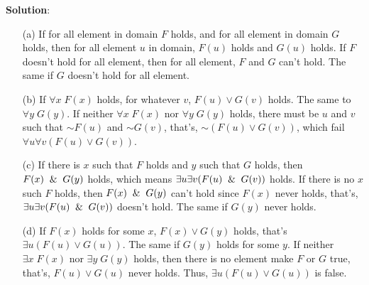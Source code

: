 \documentclass{ctexart}
\newcommand{\unsim}{\mathord{\sim}}
\begin{document}
\textbf{Solution}:
\begin{itemize}

\item[(a)] If for all element in domain $F$ holds, and for all element in domain $G$ holds, then for all element $u$
in domain, $F(u)$ holds and $G(u)$ holds. If $F$ doesn't hold for all element,
then for all element, $F$ and $G$ can't hold. The same if $G$ doesn't hold for all element.

\item[(b)] If $\forall x\; F(x)$ holds, for whatever $v$, $F(u) \lor G(v)$ holds. The same to $\forall y\; G(y)$.
If neither $\forall x\; F(x)$ nor $\forall y\; G(y)$ holds, there must be $u$ and $v$ such that
$\unsim F(u)$ and $\unsim G(v)$, that's, $\unsim (F(u) \lor G(v))$, which fail $\forall u\forall v(F(u) \lor G(v))$.

\item[(c)] If there is $x$ such that $F$ holds and $y$ such that $G$ holds, then $F(x) \And G(y)$ holds, which means
$\exists u\exists v(F(u) \And G(v))$ holds. If there is no $x$ such $F$ holds, then $F(x) \And G(y)$ can't hold
since $F(x)$ never holds, that's, $\exists u\exists v(F(u) \And G(v))$ doesn't hold. The same if $G(y)$ never holds.

\item[(d)] If $F(x)$ holds for some $x$, $F(x) \lor G(y)$ holds, that's $\exists u(F(u) \lor G(u))$. The same if $G(y)$ holds
for some $y$. If neither $\exists x\; F(x)$ nor $\exists y\; G(y)$ holds, then there is no element make $F$ or $G$ true,
that's, $F(u) \lor G(u)$ never holds. Thus, $\exists u(F(u) \lor G(u))$ is false.

\end{itemize}
\end{document}
